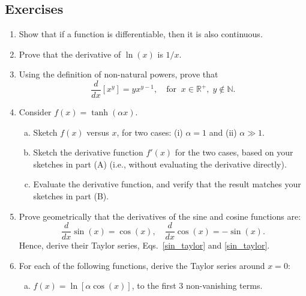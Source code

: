 \documentclass[10pt,a4paper]{article}
\begin{document}
\subsection{Exercises}\label{exercises}

\begin{enumerate}
\item
  Show that if a function is differentiable, then it is also
  continuous.

\item
  Prove that the derivative of $\ln(x)$ is $1/x$.

\item
  Using the definition of non-natural powers, prove that
  \begin{equation}
    \frac{d}{dx} [x^y] = y x^{y-1},
    \quad\mathrm{for}\;\;x \in \mathbb{R}^+, \; y \notin \mathbb{N}.
  \end{equation}

\item
  Consider $f(x) = \tanh(\alpha x)$.

  \begin{enumerate}[(a)]
  \item
    Sketch $f(x)$ versus $x$, for two cases: (i) $\alpha = 1$ and
    (ii) $\alpha \gg 1$.

  \item
    Sketch the derivative function $f'(x)$ for the two cases, based on
    your sketches in part (A) (i.e., without evaluating the derivative
    directly).

  \item
    Evaluate the derivative function, and verify that the result matches
    your sketches in part (B).
  \end{enumerate}

\item
  Prove geometrically that the derivatives of the sine and cosine
  functions are:
  \begin{equation}
    \frac{d}{dx}\sin(x) = \cos(x), \quad\frac{d}{dx}\cos(x) = -\sin(x).
  \end{equation}
  Hence, derive their Taylor series, Eqs.~\eqref{sin_taylor} and
  \eqref{sin_taylor}.

\item
  For each of the following functions, derive the Taylor series around
  $x = 0$:

  \begin{enumerate}[(a)]
  \item
    $f(x) = \ln\left[\alpha \cos(x)\right]$, to the first 3
    non-vanishing terms.


\end{enumerate}
\end{enumerate}
\end{document}
